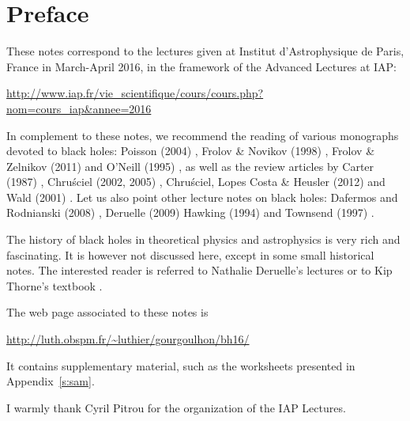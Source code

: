 \chapter*{Preface}

These notes correspond to the lectures given at
Institut d'Astrophysique de Paris, France in March-April 2016, in the
framework of the Advanced Lectures at IAP:

\centerline{\url{http://www.iap.fr/vie_scientifique/cours/cours.php?nom=cours_iap&annee=2016}}

\vspace{2ex}

In complement to these notes, we recommend the reading of various monographs
devoted to black holes: Poisson (2004) \cite{Poiss04}, Frolov \& Novikov (1998) \cite{FroloN98},
Frolov \& Zelnikov (2011) \cite{FroloZ11} and O'Neill (1995) \cite{ONeil95}, as well as the review
articles by Carter (1987) \cite{Carte87}, Chru\'sciel (2002, 2005) \cite{Chrus02, Chrus05},
Chru\'sciel, Lopes Costa \& Heusler (2012) \cite{ChrusLH12} and Wald (2001) \cite{Wald01}.
Let us also point other lecture notes on black holes:
Dafermos and Rodnianski (2008) \cite{DaferR13},  Deruelle (2009) \cite{Derue09}
Hawking (1994) \cite{Hawki94,HawkiP15} and Townsend (1997) \cite{Towns97}.

The history of black holes in theoretical physics and astrophysics is
very rich and fascinating. It is however not discussed here, except in some
small historical notes. The interested
reader is referred to Nathalie Deruelle's lectures \cite{Derue09} or to Kip Thorne's
textbook \cite{Thorn94}.


The web page associated to these notes is

\centerline{\url{http://luth.obspm.fr/~luthier/gourgoulhon/bh16/}}

It contains supplementary material, such as the worksheets presented in
Appendix~\ref{s:sam}.

\vspace{2ex}

I warmly thank Cyril Pitrou for the organization of the IAP Lectures.
